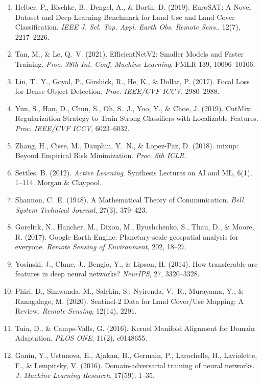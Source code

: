 \documentclass[journal]{IEEEtran}
\begin{document}
\begin{enumerate}
\item Helber, P., Bischke, B., Dengel, A., \& Borth, D. (2019). EuroSAT: A
  Novel Dataset and Deep Learning Benchmark for Land Use and Land Cover
  Classification. \emph{IEEE J. Sel. Top. Appl. Earth Obs. Remote Sens.},
  12(7), 2217--2226.
\item Tan, M., \& Le, Q.~V. (2021). EfficientNetV2: Smaller Models and
  Faster Training. \emph{Proc. 38th Int. Conf. Machine Learning}, PMLR 139,
  10096--10106.
\item Lin, T.~Y., Goyal, P., Girshick, R., He, K., \& Dollar, P. (2017).
  Focal Loss for Dense Object Detection. \emph{Proc. IEEE/CVF ICCV}, 2980--2988.
\item Yun, S., Han, D., Chun, S., Oh, S.~J., Yoo, Y., \& Choe, J. (2019).
  CutMix: Regularization Strategy to Train Strong Classifiers with
  Localizable Features. \emph{Proc. IEEE/CVF ICCV}, 6023--6032.
\item Zhang, H., Cisse, M., Dauphin, Y.~N., \& Lopez-Paz, D. (2018). mixup:
  Beyond Empirical Risk Minimization. \emph{Proc. 6th ICLR}.
\item Settles, B. (2012). \emph{Active Learning}. Synthesis Lectures on AI
  and ML, 6(1), 1--114. Morgan \& Claypool.
\item Shannon, C.~E. (1948). A Mathematical Theory of Communication.
  \emph{Bell System Technical Journal}, 27(3), 379--423.
\item Gorelick, N., Hancher, M., Dixon, M., Ilyushchenko, S., Thau, D., \&
  Moore, R. (2017). Google Earth Engine: Planetary-scale geospatial analysis
  for everyone. \emph{Remote Sensing of Environment}, 202, 18--27.
\item Yosinski, J., Clune, J., Bengio, Y., \& Lipson, H. (2014). How
  transferable are features in deep neural networks? \emph{NeurIPS}, 27,
  3320--3328.
\item Phiri, D., Simwanda, M., Salekin, S., Nyirenda, V.~R., Murayama, Y.,
  \& Ranagalage, M. (2020). Sentinel-2 Data for Land Cover/Use Mapping: A
  Review. \emph{Remote Sensing}, 12(14), 2291.
\item Tuia, D., \& Camps-Valls, G. (2016). Kernel Manifold Alignment for
  Domain Adaptation. \emph{PLOS ONE}, 11(2), e0148655.
\item Ganin, Y., Ustunova, E., Ajakan, H., Germain, P., Larochelle, H.,
  Laviolette, F., \& Lempitsky, V. (2016). Domain-adversarial training of
  neural networks. \emph{J. Machine Learning Research}, 17(59), 1--35.

\end{enumerate}
\end{document}

